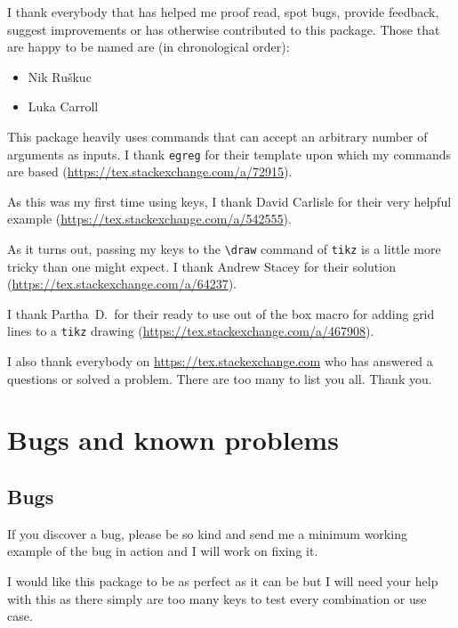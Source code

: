 \documentclass{ltxdoc}
\begin{document}
I thank everybody that has helped me proof read, spot bugs, provide feedback, suggest improvements or has otherwise contributed to this package. Those that are happy to be named are (in chronological order):
\begin{itemize}
    \item Nik Ru\v{s}kuc
    \item Luka Carroll
\end{itemize}

This package heavily uses commands that can accept an arbitrary number of arguments as inputs. I thank \texttt{egreg} for their template upon which my commands are based (\url{https://tex.stackexchange.com/a/72915}).

As this was my first time using keys, I thank David Carlisle for their very helpful example (\url{https://tex.stackexchange.com/a/542555}).

As it turns out, passing my keys to the \verb`\draw` command of \texttt{tikz} is a little more tricky than one might expect. I thank Andrew Stacey for their solution (\url{https://tex.stackexchange.com/a/64237}).

I thank Partha~D.~for their ready to use out of the box macro for adding grid lines to a \texttt{tikz} drawing (\url{https://tex.stackexchange.com/a/467908}).

I also thank everybody on \url{https://tex.stackexchange.com} who has answered a questions or solved a problem. There are too many to list you all. Thank you.

\section{Bugs and known problems}

\subsection{Bugs}

If you discover a bug, please be so kind and send me a minimum working example of the bug in action and I will work on fixing it.

I would like this package to be as perfect as it can be but I will need your help with this as there simply are too many keys to test every combination or use case.
\end{document}
